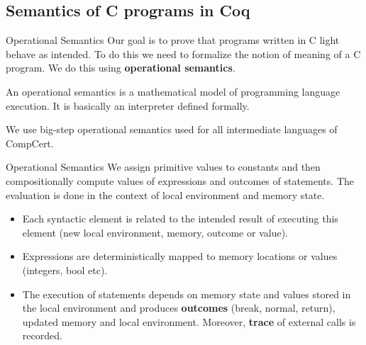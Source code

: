\documentclass[10pt]{beamer}
\begin{document}
\subsection{Semantics of C programs in Coq}

\begin{frame}{Operational Semantics}
    Our goal is to prove that programs written in C light behave as intended. To do this we need to formalize the notion of meaning of a C program. We do this using {\bf operational semantics}.

    \bigskip
    
    An operational semantics is a mathematical model of programming language execution. It is basically an interpreter defined formally.
    \bigskip
    
    We use big-step operational semantics used for all intermediate languages of CompCert.
  \end{frame}
  
  \begin{frame}[fragile]{Operational Semantics}
    We assign primitive values to constants and then compositionally compute values of expressions and outcomes of statements. The evaluation is done in the context of local environment and memory state.
   \begin{itemize}
   \item Each syntactic element is related to the intended result of executing this element (new local environment, memory, outcome or value).
    
    \item Expressions are deterministically mapped to memory locations or values (integers, bool etc).
    \item The execution of statements depends on memory state and values stored in the local environment and produces {\bf outcomes} (break, normal, return), updated memory and local environment. Moreover, {\bf trace} of external calls is recorded.
   \end{itemize}

\end{frame}
\end{document}
